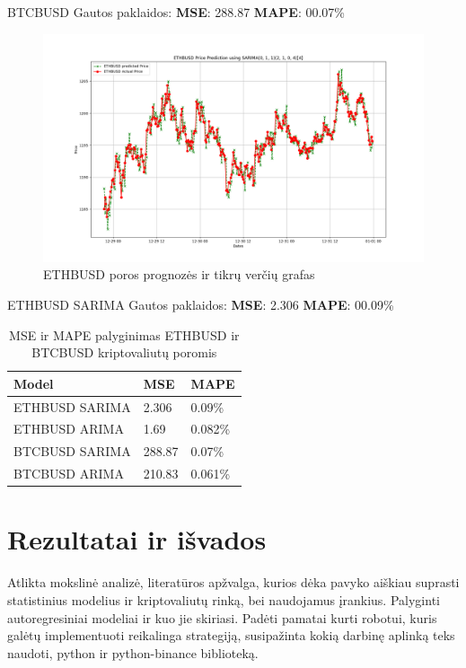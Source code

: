 \documentclass{VUMIFInfKursinis}
\begin{document}
BTCBUSD Gautos paklaidos:
\textbf{MSE}: 288.87
\textbf{MAPE}: 00.07\%

\begin{figure}[H]
  \centering
  \includegraphics[scale=0.35]{img/ethbusd_sarima_full.png}
  \caption{ETHBUSD poros prognozės ir tikrų verčių grafas}
  \label{fig:ethbusd_sarima_results}
\end{figure}


ETHBUSD SARIMA Gautos paklaidos:
\textbf{MSE}: 2.306
\textbf{MAPE}: 00.09\%

\vspace{20pt}

\begin{table}[h]
  \centering
  \caption{MSE ir MAPE palyginimas ETHBUSD ir BTCBUSD kriptovaliutų poromis}
  \begin{tabularx}{\linewidth}{|X|X|X|}
    \hline
    \textbf{Model} & \textbf{MSE} & \textbf{MAPE} \\ \hline
    ETHBUSD SARIMA & 2.306        & 0.09\%        \\ \hline
    ETHBUSD ARIMA  & 1.69         & 0.082\%       \\ \hline
    BTCBUSD SARIMA & 288.87       & 0.07\%        \\ \hline
    BTCBUSD ARIMA  & 210.83       & 0.061\%       \\ \hline
  \end{tabularx}
\end{table}

\section{Rezultatai ir išvados}
Atlikta mokslinė analizė, literatūros apžvalga, kurios dėka pavyko aiškiau suprasti statistinius modelius ir kriptovaliutų rinką, bei naudojamus įrankius.
Palyginti autoregresiniai modeliai ir kuo jie skiriasi. Padėti pamatai kurti robotui, kuris galėtų implementuoti reikalinga strategiją, susipažinta kokią
darbinę aplinką teks naudoti, python ir python-binance biblioteką.
\end{document}
